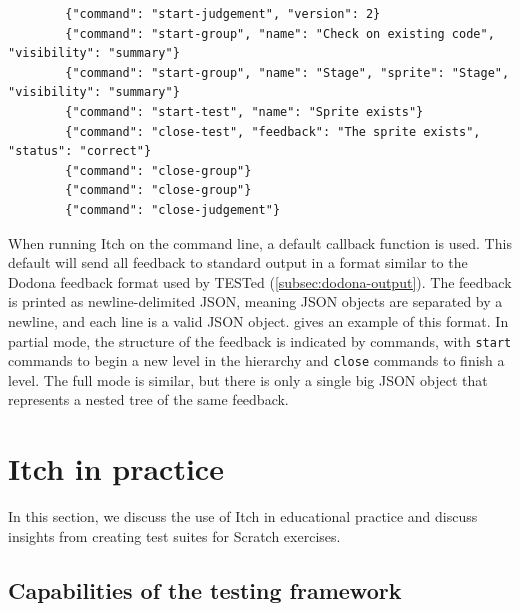 \documentclass[../main]{subfiles}
\begin{document}
\begin{listing}
    \begin{wide}
        \begin{verbatim}
        {"command": "start-judgement", "version": 2}
        {"command": "start-group", "name": "Check on existing code", "visibility": "summary"}
        {"command": "start-group", "name": "Stage", "sprite": "Stage", "visibility": "summary"}
        {"command": "start-test", "name": "Sprite exists"}
        {"command": "close-test", "feedback": "The sprite exists", "status": "correct"}
        {"command": "close-group"}
        {"command": "close-group"}
        {"command": "close-judgement"}
        \end{verbatim}
    \end{wide}
    \caption{Example of the output generated by Itch for a test suite with two nested groups, with one test. Note the similarity to \cref{lst:tested-output-example}.}\label{lst:itch-output-example-partial}
\end{listing}

When running Itch on the command line, a default callback function is used.
This default will send all feedback to standard output in a format similar to the Dodona feedback format used by TESTed (\cref{subsec:dodona-output}).
The feedback is printed as newline-delimited JSON, meaning JSON objects are separated by a newline, and each line is a valid JSON object.
 gives an example of this format.
In partial mode, the structure of the feedback is indicated by commands, with \texttt{start} commands to begin a new level in the hierarchy and \texttt{close} commands to finish a level.
The full mode is similar, but there is only a single big JSON object that represents a nested tree of the same feedback.

\section{Itch in practice}\label{sec:itch-evaluation}

In this section, we discuss the use of Itch in educational practice and discuss insights from creating test suites for Scratch exercises.

\subsection{Capabilities of the testing framework}\label{subsec:capabilities-of-the-testing-framework}
\end{document}
